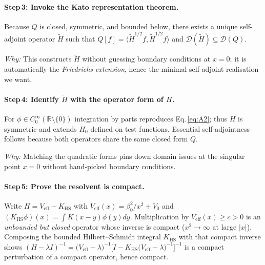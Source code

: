 \documentclass[11pt]{article}
\begin{document}
\vspace{.3em}
\paragraph{Step\,3: Invoke the Kato representation theorem.}

Because \(Q\) is closed, symmetric, and bounded below,
there exists a unique self-adjoint operator \(\tilde H\) such that
\(Q[f]=\langle\tilde H^{1/2}f,\tilde H^{1/2}f\rangle\) and
\(\mathcal D(\tilde H) \subseteq \mathcal D(Q)\).

\emph{Why:}  This constructs \(\tilde H\) without guessing boundary
conditions at \(x=0\); it is automatically the \emph{Friedrichs
extension}, hence the minimal self-adjoint realisation we want.

\vspace{.3em}
\paragraph{Step\,4: Identify $\tilde H$ with the operator form of \(H\).}

For \(\phi\in C_{0}^{\infty}(\mathbb R\setminus\{0\})\) integration by
parts reproduces Eq.\,\eqref{eq:A2}; thus
\(H\) is symmetric and extends \(H_{0}\) defined on test functions.
Essential self-adjointness follows because both operators share the
same closed form \(Q\).

\emph{Why:}  Matching the quadratic forms pins down domain issues at
the singular point \(x=0\) without hand-picked boundary
conditions.

\vspace{.3em}
\paragraph{Step\,5: Prove the resolvent is compact.}

Write \(H = V_{\mathrm{eff}} - K_{\mathrm{HS}}\) with
\(V_{\mathrm{eff}}(x)=\beta_{0}^{2}/x^{2}+V_{0}\) and
\(
  (K_{\mathrm{HS}}\phi)(x)=\int K(x-y)\phi(y)dy
\).
Multiplication by \(V_{\mathrm{eff}}(x)\ge c>0\) is an
\emph{unbounded but closed} operator whose inverse is compact
(\(x^{2}\!\to\!\infty\) at large $|x|$).
Composing the bounded Hilbert–Schmidt integral
\(K_{\mathrm{HS}}\) with that compact inverse shows
\(
  (H-\lambda I)^{-1}
  = \bigl(V_{\mathrm{eff}}-\lambda\bigr)^{-1}
    \bigl[I
     -K_{\mathrm{HS}}\bigl(V_{\mathrm{eff}}-\lambda\bigr)^{-1}\bigr]^{-1}
\)
is a compact perturbation of a compact operator, hence compact.
\end{document}
